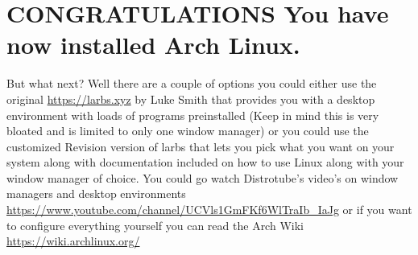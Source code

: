 \documentclass[titlepage]{article}
\begin{document}
\section{CONGRATULATIONS You have now installed Arch Linux.}
  But what next? Well there are a couple of options you could either use the original \url{https://larbs.xyz} by Luke Smith that provides you with a desktop environment with loads of programs preinstalled (Keep in mind this is very bloated and is limited to only one window manager) or you could use the customized Revision version of larbs that lets you pick what you want on your system along with documentation included on how to use Linux along with your window manager of choice. You could go watch Distrotube's video's on window managers and desktop environments \url{https://www.youtube.com/channel/UCVls1GmFKf6WlTraIb_IaJg}
  or if you want to configure everything yourself you can read the Arch Wiki \url{https://wiki.archlinux.org/}
\end{document}
